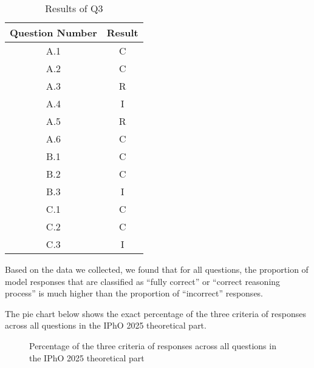 \documentclass[12pt]{article}
\begin{document}
\begin{table}[htbp]
\begin{subtable}{0.3\linewidth}
    \end{subtable}
    \hfill
    \begin{subtable}{0.3\linewidth}
      \centering
      \begin{tabular}{|c|c|}
          \hline
          Question Number & Result \\
          \hline
          A.1 & C \\
          A.2 & C \\
          A.3 & R \\
          A.4 & I \\
          A.5 & R \\
          A.6 & C \\
          B.1 & C \\
          B.2 & C \\
          B.3 & I \\
          C.1 & C \\
          C.2 & C \\
          C.3 & I \\
          \hline
      \end{tabular}
      \caption{Results of Q3}
    \end{subtable}
\end{table}

Based on the data we collected, we found that for all questions, the proportion of model responses that are classified as “fully correct” or “correct reasoning process” is much higher than the proportion of “incorrect” responses.

The pie chart below shows the exact percentage of the three criteria of responses across all questions in the IPhO 2025 theoretical part.
\begin{figure}[htbp]
  \centering
  \caption{Percentage of the three criteria of responses across all questions in the IPhO 2025 theoretical part}
\end{figure}
\end{document}
